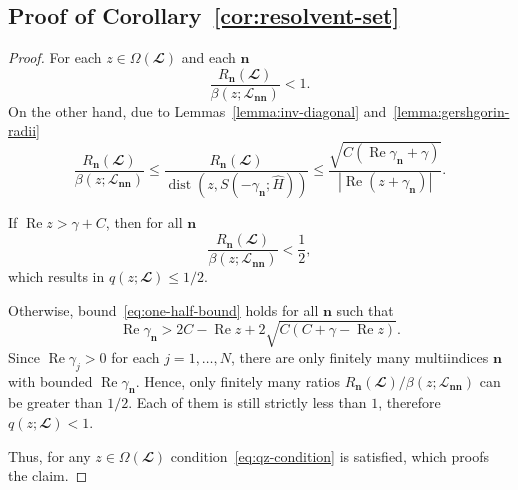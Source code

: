 \documentclass{SciPost}
\renewcommand{\Re}{\operatorname{Re}}
\begin{document}
\subsection{Proof of Corollary~\ref{cor:resolvent-set}}
\label{sec:corr-resolvent-set}
\begin{proof}
    For each $z \in \Omega(\mathbfcal L)$ and each $\bm n$
    \begin{equation}
        \frac{R_{\bm n}(\mathbfcal L)}{\beta(z; \mathcal L_{\bm{nn}})} < 1.
    \end{equation}
    On the other hand, due to Lemmas~\ref{lemma:inv-diagonal} and~\ref{lemma:gershgorin-radii}
    \begin{equation}
        \frac{R_{\bm n}(\mathbfcal L)}{\beta(z; \mathcal L_{\bm{nn}})} \leqslant 
        \frac{R_{\bm n}(\mathbfcal L)}{\operatorname{dist}\left(z, S\left(-\gamma_{\bm n}; \hat H\right)\right)} \leqslant
        \frac{\sqrt{C(\Re \gamma_{\bm n} + \gamma)}}{|\Re (z + \gamma_{\bm n})|}.
    \end{equation}

    If $\Re z > \gamma + C$, then for all $\bm n$
    \begin{equation}
        \frac{R_{\bm n}(\mathbfcal L)}{\beta(z; \mathcal L_{\bm{nn}})} < \frac{1}{2},
        \label{eq:one-half-bound}
    \end{equation}
    which results in $q(z; \mathbfcal L) \leqslant 1/2$.

    Otherwise, bound~\eqref{eq:one-half-bound} holds for all $\bm n$ such that
    \begin{equation}
        \Re \gamma_{\bm n} > 2C - \Re z + 2 \sqrt{C(C + \gamma - \Re z)}.
    \end{equation}
    Since $\Re \gamma_j > 0$ for each $j = 1,\ldots, N$, there are only finitely many multiindices $\bm n$ with bounded $\Re \gamma_{\bm n}$. Hence, only finitely many ratios $R_{\bm n}(\mathbfcal L) / \beta(z; \mathcal L_{\bm{nn}})$ can be greater than $1/2$. Each of them is still strictly less than $1$, therefore $q(z; \mathbfcal L) < 1$.

    Thus, for any $z \in \Omega(\mathbfcal L)$ condition~\eqref{eq:qz-condition} is satisfied, which proofs the claim.
\end{proof}
\end{document}
